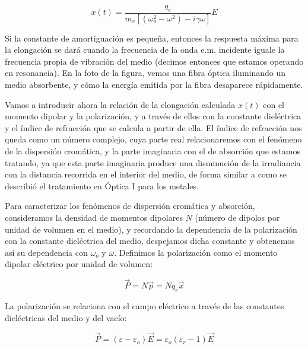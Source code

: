 \documentclass[12pt,a4paper]{report}
\newcommand{\esp}{\vspace{0.5cm}}
\begin{document}
	\esp
	
	\begin{equation}
		x(t) = \frac{q_e}{m_e [(\omega_o^2 - \omega^2) - i\gamma\omega]} E
	\end{equation}
	
	\esp
	
	Si la constante de amortiguación es pequeña, entonces la respuesta máxima para la elongación se dará cuando la frecuencia de la onda e.m. incidente iguale la frecuencia propia de vibración del medio (decimos entonces que estamos operando en resonancia). En la foto de la figura, vemos una fibra óptica iluminando un medio absorbente, y cómo la energía emitida por la fibra desaparece rápidamente.
	
	\esp
	
	Vamos a introducir ahora la relación de la elongación calculada $x(t)$ con el momento dipolar y la polarización, y a través de ellos con la constante dieléctrica y el índice de refracción que se calcula a partir de ella. El índice de refracción nos queda como un número complejo, cuya parte real relacionaremos con el fenómeno de la dispersión cromática, y la parte imaginaria con el de absorción que estamos tratando, ya que esta parte imaginaria produce una disminución de la irradiancia con la distancia recorrida en el interior del medio, de forma similar a como se describió el tratamiento en Óptica I para los metales.
	
	\esp
	
	Para caracterizar los fenómenos de dispersión cromática y absorción, consideramos la densidad de momentos dipolares $N$ (número de dipolos por unidad de volumen en el medio), y recordando la dependencia de la polarización con la constante dieléctrica del medio, despejamos dicha constante y obtenemos así su dependencia con $\omega_o$ y $\omega$. Definimos la polarización como el momento dipolar eléctrico por unidad de volumen:
	
	\esp
	
	\begin{equation}
		\vec{P} = N\vec{p} = Nq_e\vec{x}
	\end{equation}
	
	\esp
	
	La polarización se relaciona con el campo eléctrico a través de las constantes dieléctricas del medio y del vacío:
	
	\esp
	
	\begin{equation}
		\vec{P} = (\varepsilon - \varepsilon_o) \vec{E} = \varepsilon_o (\varepsilon_r - 1) \vec{E}
	\end{equation}
	
\end{document}
